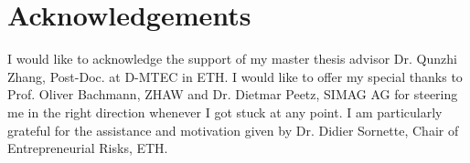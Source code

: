 \chapter*{Acknowledgements}
I would like to acknowledge the support of my master thesis advisor Dr. Qunzhi Zhang, Post-Doc. at D-MTEC in ETH. I would like to offer my special thanks to Prof. Oliver Bachmann, ZHAW and Dr. Dietmar Peetz, SIMAG AG for steering me in the right direction whenever I got stuck at any point. I am particularly grateful for the assistance and motivation given by Dr. Didier Sornette, Chair of Entrepreneurial Risks, ETH.